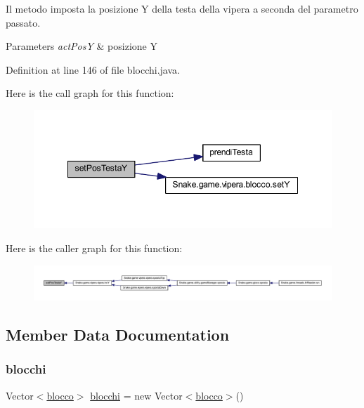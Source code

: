 Il metodo imposta la posizione Y della testa della vipera a seconda del parametro passato. 


\begin{DoxyParams}{Parameters}
{\em act\+PosY} & posizione Y \\
\hline
\end{DoxyParams}


Definition at line 146 of file blocchi.\+java.

Here is the call graph for this function\+:
\nopagebreak
\begin{figure}[H]
\begin{center}
\leavevmode
\includegraphics[width=348pt]{class_snake_1_1game_1_1vipera_1_1blocchi_a7136da8bd75e6d0622eecf38aea1b60e_cgraph}
\end{center}
\end{figure}
Here is the caller graph for this function\+:
\nopagebreak
\begin{figure}[H]
\begin{center}
\leavevmode
\includegraphics[width=350pt]{class_snake_1_1game_1_1vipera_1_1blocchi_a7136da8bd75e6d0622eecf38aea1b60e_icgraph}
\end{center}
\end{figure}


\subsection{Member Data Documentation}
\mbox{\label{class_snake_1_1game_1_1vipera_1_1blocchi_ad6cdae3853215d2776147ba0c54ad406}} 
\subsubsection{\texorpdfstring{blocchi}{blocchi}}
{\footnotesize\ttfamily Vector$<$\mbox{\hyperlink{class_snake_1_1game_1_1vipera_1_1blocco}{blocco}}$>$ \mbox{\hyperlink{class_snake_1_1game_1_1vipera_1_1blocchi}{blocchi}} = new Vector$<$\mbox{\hyperlink{class_snake_1_1game_1_1vipera_1_1blocco}{blocco}}$>$()\hspace{0.3cm}{\ttfamily [private]}}

